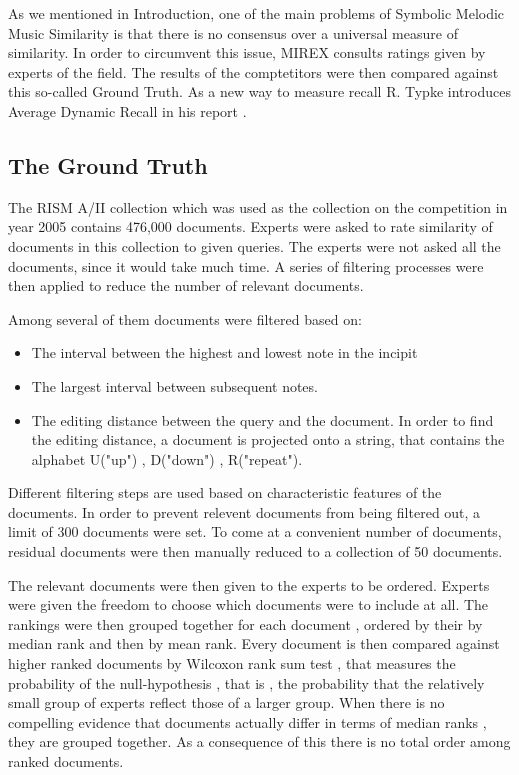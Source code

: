 \documentclass{llncs}
\begin{document}
		As we mentioned in Introduction, one of the main problems of Symbolic Melodic Music Similarity is that there is no consensus over a universal measure of similarity. In order to circumvent this issue, MIREX consults ratings given by experts of the field. The results of the comptetitors were then compared against this so-called Ground Truth. As a new way to measure recall R. Typke introduces Average Dynamic Recall in his report \cite{three}.       


		\subsection{The Ground Truth}
 		The RISM A/II collection which was used as the collection on the competition in year 2005 contains 476,000 documents. Experts were asked to rate similarity of documents in this collection to given queries. The experts were not asked all the documents, since it would take much time. A series of filtering processes were then applied to reduce the number of relevant documents. 

 		Among several of them documents were filtered based on: 

 		\begin{itemize}
 			\item The interval between the highest and lowest note in the incipit
 			\item The largest interval between subsequent notes.
 			\item The editing distance between the query and the document. In order to find the editing distance, a document is projected onto a string, that contains the alphabet U("up") , D("down") , R("repeat"). 
 		\end{itemize} 

 		Different filtering steps are used based on characteristic features of the documents. In order to prevent relevent documents from being filtered out, a limit of 300 documents were set. To come at a convenient number of documents, residual documents were then manually reduced to a collection of 50 documents.

 		The relevant documents were then given to the experts to be ordered. Experts were given the freedom to choose which documents were to include at all. The rankings were then grouped together for each document , ordered by their by median rank and then by mean rank. Every document is then compared against higher ranked documents by Wilcoxon rank sum test , that measures the probability of the null-hypothesis , that is , the probability that the relatively small group of experts reflect those of a larger group. When there is no compelling evidence that documents actually differ in terms of median ranks , they are grouped together. As a consequence of this there is no total order among ranked documents. 
\end{document}
